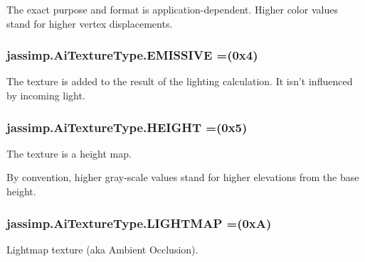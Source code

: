The exact purpose and format is application-\/dependent. Higher color values stand for higher vertex displacements. \hypertarget{enumjassimp_1_1_ai_texture_type_ae0a44e5f47d1ae2ac1e4aa8dd442d683}{
\subsubsection[{E\+M\+I\+S\+S\+I\+V\+E}]{\setlength{\rightskip}{0pt plus 5cm}jassimp.\+Ai\+Texture\+Type.\+E\+M\+I\+S\+S\+I\+V\+E =(0x4)}}\label{enumjassimp_1_1_ai_texture_type_ae0a44e5f47d1ae2ac1e4aa8dd442d683}
The texture is added to the result of the lighting calculation. It isn't influenced by incoming light. \hypertarget{enumjassimp_1_1_ai_texture_type_a2ae5ea05b8cf669d375fd8073e7066be}{
\subsubsection[{H\+E\+I\+G\+H\+T}]{\setlength{\rightskip}{0pt plus 5cm}jassimp.\+Ai\+Texture\+Type.\+H\+E\+I\+G\+H\+T =(0x5)}}\label{enumjassimp_1_1_ai_texture_type_a2ae5ea05b8cf669d375fd8073e7066be}
The texture is a height map.

By convention, higher gray-\/scale values stand for higher elevations from the base height. \hypertarget{enumjassimp_1_1_ai_texture_type_abd4c98c38f08251ce364e06f24121a54}{
\subsubsection[{L\+I\+G\+H\+T\+M\+A\+P}]{\setlength{\rightskip}{0pt plus 5cm}jassimp.\+Ai\+Texture\+Type.\+L\+I\+G\+H\+T\+M\+A\+P =(0x\+A)}}\label{enumjassimp_1_1_ai_texture_type_abd4c98c38f08251ce364e06f24121a54}
Lightmap texture (aka Ambient Occlusion).


